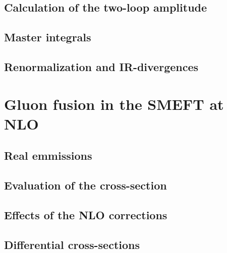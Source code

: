 \documentclass{harvard-thesis}
\begin{document}
\section{Calculation of the two-loop amplitude}
\section{Master integrals}
\section{Renormalization and IR-divergences}

\chapter{Gluon fusion in the SMEFT at NLO}
\section{Real emmissions}
\section{Evaluation of the cross-section}
\section{Effects of the NLO corrections}
\section{Differential cross-sections}




\end{document}
